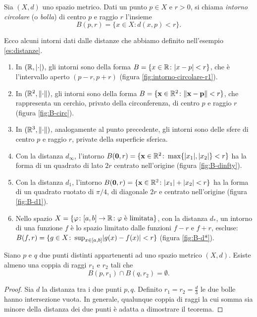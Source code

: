 \begin{definizione}
Sia $(X,d)$ uno spazio metrico. Dati un punto $p\in X$ e $r>0$, si chiama \emph{intorno circolare} (o \emph{bolla}) di centro $p$ e raggio $r$ l'insieme
\[
B(p,r)=\{x\in X\colon d(x,p)<r\}.
\]
\end{definizione}
\begin{esempio} \label{es:intorni}
	Ecco alcuni intorni dati dalle distanze che abbiamo definito nell'esempio \ref{es:distanze}.
	\begin{enumerate}
		\item In $(\mathbb{R},\lvert\cdot\rvert)$, gli intorni sono della forma $B=\{x\in\mathbb{R}\colon\lvert x-p\rvert<r\}$, che è l'intervallo aperto $(p-r,p+r)$ (figura \ref{fig:intorno-circolare-r1}).
			
		\item In $(\mathbb{R}^2,\lVert\cdot\rVert)$, gli intorni sono della forma $B=\{\mathbf{x}\in\mathbb{R}^2\colon\lVert\mathbf{x}-\mathbf{p}\rVert<r\}$, che rappresenta un cerchio, privato della circonferenza, di centro $p$ e raggio $r$ (figura \ref{fig:B-circ}).
			
		\item In $(\mathbb{R}^3,\lVert\cdot\rVert)$, analogamente al punto precedente, gli intorni sono delle sfere di centro $p$ e raggio $r$, private della superficie sferica.
		\item Con la distanza $d_\infty$, l'intorno $B(\mathbf{0},r)=\{\mathbf{x}\in\mathbb{R}^2\colon\max\{\lvert x_1\rvert,\lvert x_2\rvert\}<r\}$ ha la forma di un quadrato di lato $2r$ centrato nell'origine (figura \ref{fig:B-dinfty}).
		
		\item Con la distanza $d_1$, l'intorno $B(\mathbf{0},r)=\{\mathbf{x}\in\mathbb{R}^2\colon\lvert x_1\rvert+\lvert x_2\rvert<r\}$ ha la forma di un quadrato ruotato di $\pi/4$, di diagonale $2r$ e centrato nell'origine (figura \ref{fig:B-d1}).
		
		\item Nello spazio $X=\{\varphi\colon[a,b]\to\mathbb{R}\colon\varphi\text{ è limitata}\}$, con la distanza $d_*$, un intorno di una funzione $f$ è lo spazio limitato dalle funzioni $f-r$ e $f+r$, escluse: $B(f,r)=\{g\in X\colon\sup_{x\in[a,b]}\lvert g(x)-f(x)\rvert<r\}$ (figura \ref{fig:B-d*}).
		
	\end{enumerate}
\end{esempio}

\begin{teorema}
\label{t:hausdorff}
Siano $p$ e $q$ due punti distinti appartenenti ad uno spazio metrico $(X,d)$. Esiste almeno una coppia di raggi $r_1$ e $r_2$ tali che
\[
B(p,r_1)\cap B(q,r_2)=\emptyset.
\]
\end{teorema}
\begin{proof}
	Sia $d$ la distanza tra i due punti $p,q$. Definito $r_1=r_2=\frac{d}3$ le due bolle hanno intersezione vuota. In generale, qualunque coppia di raggi la cui somma sia minore della distanza dei due punti è adatta a dimostrare il teorema.
\end{proof}

